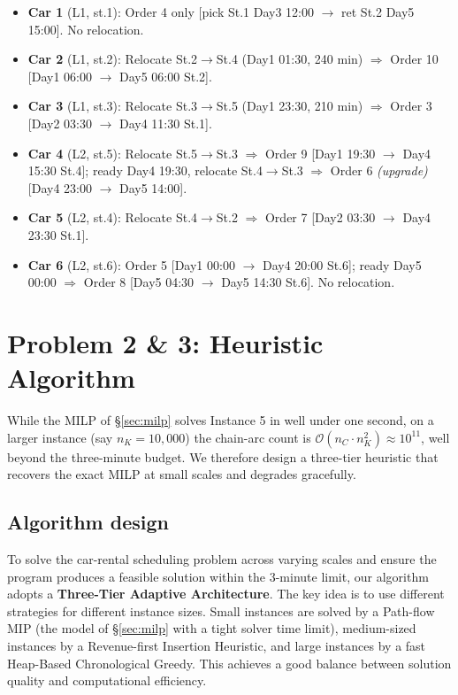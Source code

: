 \documentclass[a4paper, 12pt]{article}
\begin{document}
\begin{itemize}
\item \textbf{Car 1} (L1, st.1): Order 4 only [pick St.1 Day3 12:00 $\to$ ret St.2 Day5 15:00]. No relocation.
\item \textbf{Car 2} (L1, st.2): Relocate St.2$\to$St.4 (Day1 01:30, 240 min) $\Rightarrow$ Order 10 [Day1 06:00 $\to$ Day5 06:00 St.2].
\item \textbf{Car 3} (L1, st.3): Relocate St.3$\to$St.5 (Day1 23:30, 210 min) $\Rightarrow$ Order 3 [Day2 03:30 $\to$ Day4 11:30 St.1].
\item \textbf{Car 4} (L2, st.5): Relocate St.5$\to$St.3 $\Rightarrow$ Order 9 [Day1 19:30 $\to$ Day4 15:30 St.4]; ready Day4 19:30, relocate St.4$\to$St.3 $\Rightarrow$ Order 6 \emph{(upgrade)} [Day4 23:00 $\to$ Day5 14:00].
\item \textbf{Car 5} (L2, st.4): Relocate St.4$\to$St.2 $\Rightarrow$ Order 7 [Day2 03:30 $\to$ Day4 23:30 St.1].
\item \textbf{Car 6} (L2, st.6): Order 5 [Day1 00:00 $\to$ Day4 20:00 St.6]; ready Day5 00:00 $\Rightarrow$ Order 8 [Day5 04:30 $\to$ Day5 14:30 St.6]. No relocation.
\end{itemize}


\section{Problem 2 \& 3: Heuristic Algorithm}\label{sec:heuristic}

While the MILP of \S\ref{sec:milp} solves Instance 5 in well under one second, on a larger instance (say $n_K = 10{,}000$) the chain-arc count is $\mathcal{O}(n_C \cdot n_K^2) \approx 10^{11}$, well beyond the three-minute budget. We therefore design a three-tier heuristic that recovers the exact MILP at small scales and degrades gracefully.

\subsection{Algorithm design}

To solve the car-rental scheduling problem across varying scales and ensure the program produces a feasible solution within the 3-minute limit, our algorithm adopts a \textbf{Three-Tier Adaptive Architecture}. The key idea is to use different strategies for different instance sizes. Small instances are solved by a Path-flow MIP (the model of \S\ref{sec:milp} with a tight solver time limit), medium-sized instances by a Revenue-first Insertion Heuristic, and large instances by a fast Heap-Based Chronological Greedy. This achieves a good balance between solution quality and computational efficiency.
\end{document}
